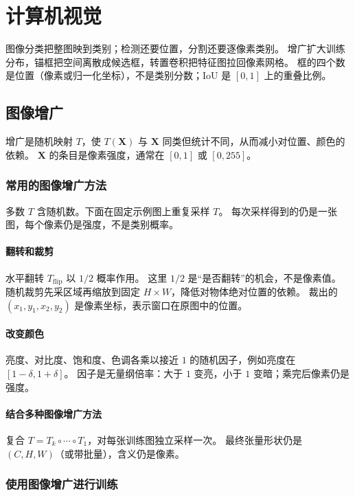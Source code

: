 \chapter{计算机视觉}

图像分类把整图映到类别；检测还要位置，分割还要逐像素类别。
增广扩大训练分布，锚框把空间离散成候选框，转置卷积把特征图拉回像素网格。
框的四个数是位置（像素或归一化坐标），不是类别分数；IoU 是 $[0,1]$ 上的重叠比例。

\section{图像增广}

增广是随机映射 $T$，使 $T(\bm{X})$ 与 $\bm{X}$ 同类但统计不同，从而减小对位置、颜色的依赖。
$\bm{X}$ 的条目是像素强度，通常在 $[0,1]$ 或 $[0,255]$。

\subsection{常用的图像增广方法}

多数 $T$ 含随机数。下面在固定示例图上重复采样 $T$。
每次采样得到的仍是一张图，每个像素仍是强度，不是类别概率。

\subsubsection{翻转和裁剪}

水平翻转 $T_{\mathrm{flip}}$ 以 $1/2$ 概率作用。
这里 $1/2$ 是“是否翻转”的机会，不是像素值。
随机裁剪先采区域再缩放到固定 $H\times W$，降低对物体绝对位置的依赖。
裁出的 $(x_1,y_1,x_2,y_2)$ 是像素坐标，表示窗口在原图中的位置。

\subsubsection{改变颜色}

亮度、对比度、饱和度、色调各乘以接近 $1$ 的随机因子，例如亮度在 $[1-\delta,1+\delta]$。
因子是无量纲倍率：大于 $1$ 变亮，小于 $1$ 变暗；乘完后像素仍是强度。

\subsubsection{结合多种图像增广方法}

复合 $T=T_k\circ\cdots\circ T_1$，对每张训练图独立采样一次。
最终张量形状仍是 $(C,H,W)$（或带批量），含义仍是像素。

\subsection{使用图像增广进行训练}

